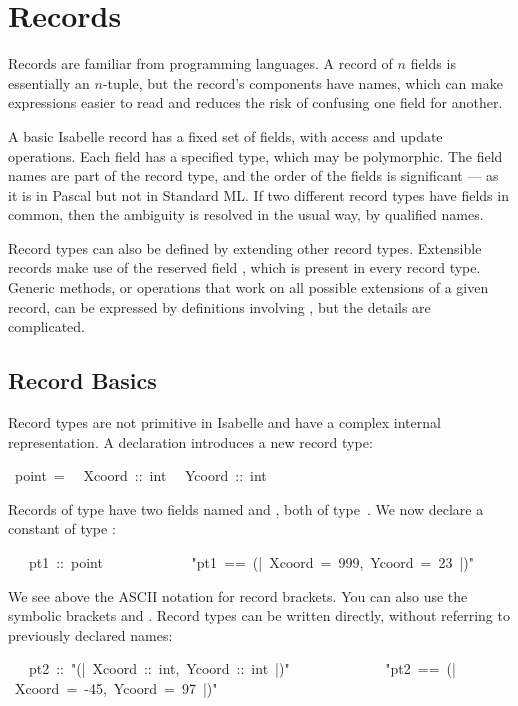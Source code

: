\section{Records} 
\label{sec:records}

%
Records are familiar from programming languages.  A record of $n$
fields is essentially an $n$-tuple, but the record's components have
names, which can make expressions easier to read and reduces the risk
of confusing one field for another.

A basic Isabelle record has a fixed set of fields, with access
and update operations.  Each field has a specified type, which may be
polymorphic.  The field names are part of the record type, and the
order of the fields is significant --- as it is in Pascal but not in
Standard ML.  If two different record types have fields in common,
then the ambiguity is resolved in the usual way, by qualified names.

Record types can also be defined by extending other record types. 
Extensible records make use of the reserved field , which is
present in every record type.  Generic methods, or operations that
work on all possible extensions of a given record, can be expressed by
definitions involving , but the details are complicated.

\subsection{Record Basics}

Record types are not primitive in Isabelle and have a complex internal
representation.  A  declaration
introduces a new record type:
\begin{isabelle}
\ point\ =\isanewline
\ \ Xcoord\ ::\ int\isanewline
\ \ Ycoord\ ::\ int
\end{isabelle}

Records of type  have two fields named  and ,
both of type~.  We now declare a constant of type
:
\begin{isabelle}
\ \ \ pt1\ ::\ point\isanewline
\ \ \ \ \ \ \ \ \ \ \ \ "pt1\ ==\ (|\ Xcoord\ =\ 999,\ Ycoord\ =\ 23\ |)"
\end{isabelle}
We see above the ASCII notation for record brackets.  You can also use
the symbolic brackets \isa{\isasymlparr} and  \isa{\isasymrparr}.
Record types can be written directly, without referring to
previously declared names: 
\begin{isabelle}
\ \ \ pt2\ ::\ "(|\ Xcoord\ ::\ int,\ Ycoord\ ::\ int\
|)"\ \isanewline
\ \ \ \ \ \ \ \ \ \ \ \ "pt2\ ==\ (|\ Xcoord\ =\ -45,\ Ycoord\ =\ 97\ |)"
\end{isabelle}

